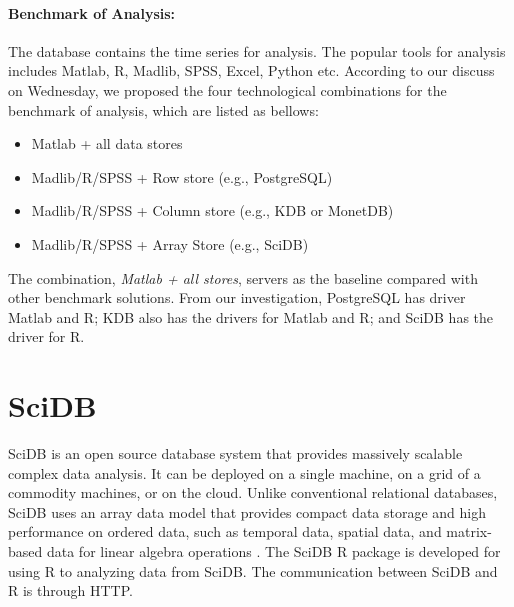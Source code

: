\documentclass[a4paper,12pt]{llncs}
\newcommand{\eg}{e.g.}
\begin{document}
\paragraph{Benchmark of Analysis:}
The database contains the time series for analysis. The popular tools for analysis includes Matlab, R, Madlib, SPSS, Excel, Python etc. According to our discuss on Wednesday, we proposed the four technological combinations for the benchmark of analysis, which are listed as bellows:
\begin{itemize}
 \item Matlab + all data stores
 \item Madlib/R/SPSS + Row store (\eg, PostgreSQL)
 \item Madlib/R/SPSS + Column store (\eg, KDB or MonetDB)
 \item Madlib/R/SPSS + Array Store (\eg, SciDB)
\end{itemize}

The combination, {\em Matlab + all stores}, servers as the baseline compared with other benchmark solutions. From our investigation, PostgreSQL has driver Matlab and R; KDB also has the drivers for Matlab and R; and SciDB has the driver for R.


\section{SciDB}
SciDB is an open source database system that provides massively scalable complex data analysis. It  can be deployed on a single machine, on a grid of a commodity machines, or on the cloud. Unlike conventional relational databases, SciDB uses an array data model that provides compact data storage and high performance on ordered data, such as temporal data, spatial data, and matrix-based data for linear algebra operations \cite{scidb}. The SciDB R package \cite{scidbr} is developed for using R to analyzing data from SciDB. The communication  between SciDB and R is through HTTP. 
\end{document}
